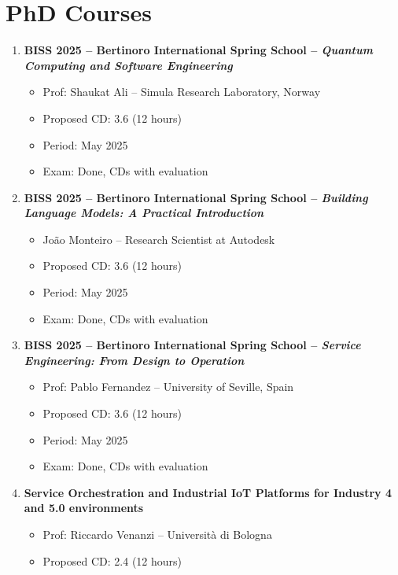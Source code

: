 \documentclass[runningheads]{llncs}
\begin{document}
{{    \section{PhD Courses}

    \begin{enumerate}
        \item \textbf{BISS 2025 -- Bertinoro International Spring School -- \textit{Quantum Computing and Software Engineering}}
        \begin{itemize}
            \item Prof: Shaukat Ali -- Simula Research Laboratory, Norway
            \item Proposed CD: 3.6 (12 hours)
            \item Period: May 2025
            \item Exam: Done, CDs with evaluation
        \end{itemize}
        \item \textbf{BISS 2025 -- Bertinoro International Spring School -- \textit{Building Language Models: A Practical Introduction}}
        \begin{itemize}
            \item João Monteiro -- Research Scientist at Autodesk
            \item Proposed CD: 3.6 (12 hours)
            \item Period: May 2025
            \item Exam: Done, CDs with evaluation
        \end{itemize}
        \item \textbf{BISS 2025 -- Bertinoro International Spring School -- \textit{Service Engineering: From Design to Operation}}
        \begin{itemize}
            \item Prof: Pablo Fernandez -- University of Seville, Spain
            \item Proposed CD: 3.6 (12 hours)
            \item Period: May 2025
            \item Exam: Done, CDs with evaluation
        \end{itemize}
        \item \textbf{Service Orchestration and Industrial IoT Platforms for Industry 4 and 5.0 environments}
        \begin{itemize}
            \item Prof: Riccardo Venanzi -- Università di Bologna
            \item Proposed CD: 2.4 (12 hours)

\end{itemize}
\end{enumerate}}}
\end{document}
